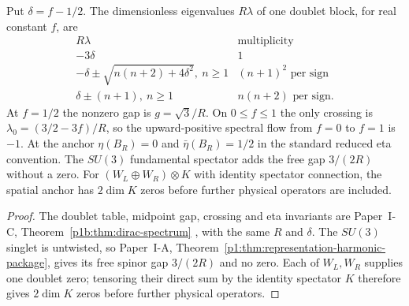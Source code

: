 \documentclass[11pt,a4paper]{article}
\begin{document}
\begin{corollary}
\label{p3f:cor:m8td-dirac-spectrum}
Put $\delta=f-1/2$. The dimensionless eigenvalues $R\lambda$ of one
doublet block, for real constant $f$, are
\begin{equation}
 \begin{array}{c|c}
 R\lambda&\text{multiplicity}\\\hline
 -3\delta&1\\
 -\delta\pm\sqrt{n(n+2)+4\delta^2},\ n\ge1&(n+1)^2\text{ per sign}\\
 \delta\pm(n+1),\ n\ge1&n(n+2)\text{ per sign}.
 \end{array}
 \label{p3f:eq:m8td-dirac-spectrum}
\end{equation}
At $f=1/2$ the nonzero gap is $g=\sqrt3/R$. On $0\le f\le1$ the only
crossing is $\lambda_0=(3/2-3f)/R$, so the upward-positive spectral flow
from $f=0$ to $f=1$ is $-1$. At the anchor
$\eta(B_R)=0$ and $\bar\eta(B_R)=1/2$ in the standard reduced eta convention.
The $SU(3)$ fundamental spectator adds the free gap $3/(2R)$ without a
zero. For $(W_L\oplus W_R)\otimes K$ with identity spectator connection,
the spatial anchor has $2\dim K$ zeros before further physical operators
are included.
\end{corollary}
\begin{proof}
The doublet table, midpoint gap, crossing and eta invariants are
Paper~I-C, Theorem~\ref{p1b:thm:dirac-spectrum}
\cite{Kugelmann2026Paper1C}, with the same \(R\) and \(\delta\).
The \(SU(3)\) singlet is untwisted, so Paper~I-A,
Theorem~\ref{p1:thm:representation-harmonic-package}, gives its free spinor
gap \(3/(2R)\) and no zero. Each of \(W_L,W_R\) supplies one
doublet zero; tensoring their direct sum by the identity spectator \(K\)
therefore gives \(2\dim K\) zeros before further physical operators.
\end{proof}
\end{document}
